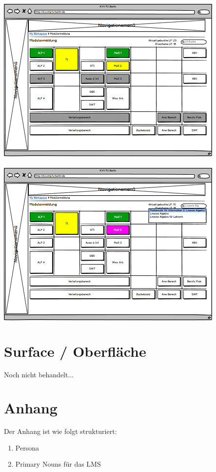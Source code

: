 \documentclass{article}
\begin{document}
\\
\includegraphics{ucd_ppt_mod_selected.png}\\
\\
\includegraphics{ucd_ppt_lv_search.png}

\newpage

\section{Surface / Oberfläche}

Noch nicht behandelt...

\newpage

\section{Anhang}

Der Anhang ist wie folgt strukturiert:
\begin{enumerate}
\item Persona
\item Primary Nouns für das LMS
\end{enumerate}

 

\end{document}
